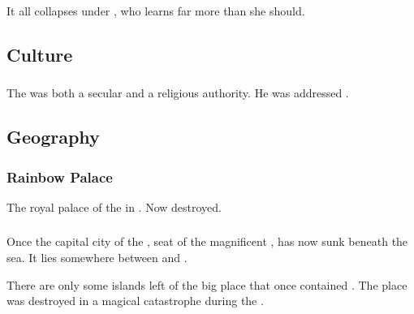 It all collapses under \Belzir, who learns far more than she should.









\subsection{Culture}





\subsubsection{\VaimonCaliph}
The \VaimonCaliph was both a secular and a religious authority. 
He was addressed .









\subsection{Geography}





\subsubsection{Rainbow Palace}
The royal palace of the \VaimonCaliph in . 
Now destroyed. 





\subsubsection{\ShiinMerodar}
\index{\ShiinMerodar}
Once the capital city of the \VaimonCaliphate, seat of the magnificent , \Merodar has now sunk beneath the sea. It lies somewhere between  and . 

There are only some islands left of the big place that once contained \ShiinMerodar. 
The place was destroyed in a magical catastrophe during the . 









